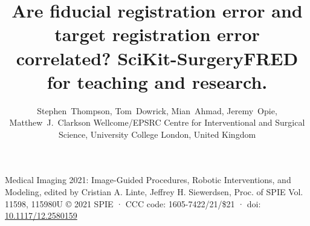 \documentclass[a4paper, lmargin=1.925cm, rmargin=1.925cm,tmargin=2.54cm,bmargin=4.94cm]{spie}
\begin{document}
%
%
\pagestyle{plain}
%
%
\title{Are fiducial registration error and target registration error correlated? SciKit-SurgeryFRED for teaching and research.}
%
%
\author{Stephen~Thompson, Tom~Dowrick, Mian~Ahmad, Jeremy~Opie, Matthew~J.~Clarkson
\skiplinehalf
{}Wellcome/EPSRC Centre for Interventional and Surgical Science, University College London, United Kingdom \\
}

%
%
%


\maketitle              %

\begin{center}
Medical Imaging 2021: 
Image-Guided Procedures, Robotic Interventions, and Modeling,\linebreak 
edited by Cristian A. Linte, Jeffrey H. Siewerdsen, 
Proc. of SPIE Vol. 11598, 115980U \linebreak
	© 2021 SPIE · 
	CCC code: 1605-7422/21/\$21 · doi: \href{https://doi.org/10.1117/12.2580159}{10.1117/12.2580159}
\end{center}

\begin{abstract}

\end{abstract}






%



\end{document}
